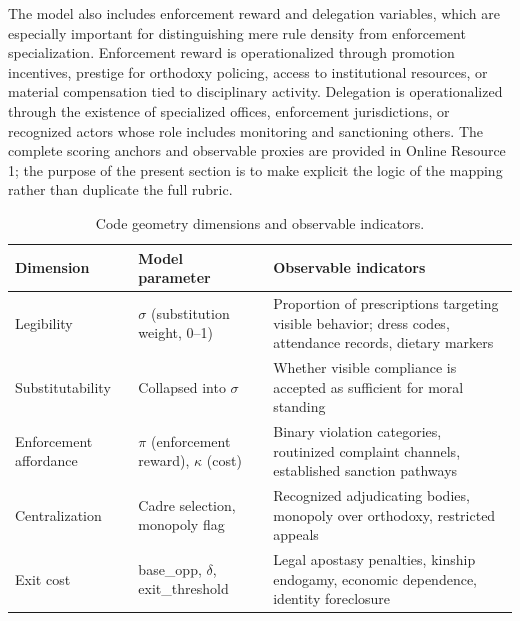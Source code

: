 \documentclass[12pt]{article}
\begin{document}
The model also includes enforcement reward and delegation variables, which are especially important for distinguishing mere rule density from enforcement specialization. Enforcement reward is operationalized through promotion incentives, prestige for orthodoxy policing, access to institutional resources, or material compensation tied to disciplinary activity. Delegation is operationalized through the existence of specialized offices, enforcement jurisdictions, or recognized actors whose role includes monitoring and sanctioning others. The complete scoring anchors and observable proxies are provided in Online Resource 1; the purpose of the present section is to make explicit the logic of the mapping rather than duplicate the full rubric.


\begin{table}[ht]
\centering
\caption{Code geometry dimensions and observable indicators.}
\label{tab:dimensions}
\begin{tabular}{lp{5.5cm}p{5.5cm}}
\toprule
Dimension & Model parameter & Observable indicators \\
\midrule
Legibility & $\sigma$ (substitution weight, 0--1) & Proportion of prescriptions targeting visible behavior; dress codes, attendance records, dietary markers \\
Substitutability & Collapsed into $\sigma$ & Whether visible compliance is accepted as sufficient for moral standing \\
Enforcement affordance & $\pi$ (enforcement reward), $\kappa$ (cost) & Binary violation categories, routinized complaint channels, established sanction pathways \\
Centralization & Cadre selection, monopoly flag & Recognized adjudicating bodies, monopoly over orthodoxy, restricted appeals \\
Exit cost & base\_opp, $\delta$, exit\_threshold & Legal apostasy penalties, kinship endogamy, economic dependence, identity foreclosure \\
\bottomrule
\end{tabular}
\end{table}
\end{document}
